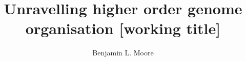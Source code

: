 \documentclass[a4paper,10pt,oneside]{book}
\title{ \vspace{3in} Unravelling higher order genome organisation {\small [working
    title]} \\ \vspace{2em} }
\author{Benjamin L. Moore}
\begin{document}
\maketitle

\tableofcontents











%







\begin{small}

\end{small}
\end{document}

